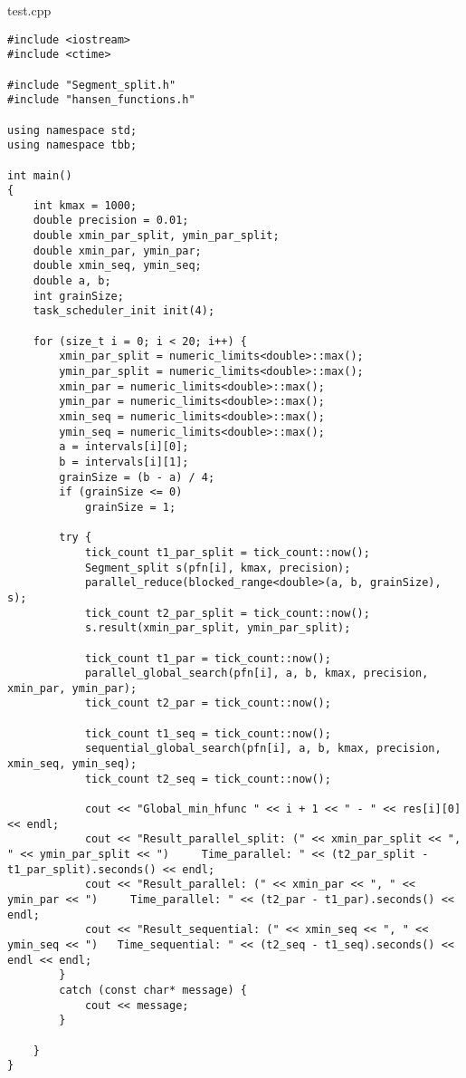 \documentclass{report}
\begin{document}
test.cpp
\begin{lstlisting}
#include <iostream>
#include <ctime>

#include "Segment_split.h"
#include "hansen_functions.h"

using namespace std;
using namespace tbb;

int main()
{
    int kmax = 1000;
    double precision = 0.01;
    double xmin_par_split, ymin_par_split;
    double xmin_par, ymin_par;
    double xmin_seq, ymin_seq;
    double a, b;
    int grainSize;
    task_scheduler_init init(4);

    for (size_t i = 0; i < 20; i++) {
        xmin_par_split = numeric_limits<double>::max();
        ymin_par_split = numeric_limits<double>::max();
        xmin_par = numeric_limits<double>::max();
        ymin_par = numeric_limits<double>::max();
        xmin_seq = numeric_limits<double>::max();
        ymin_seq = numeric_limits<double>::max();
        a = intervals[i][0];
        b = intervals[i][1];
        grainSize = (b - a) / 4;
        if (grainSize <= 0)
            grainSize = 1;

        try {
            tick_count t1_par_split = tick_count::now();
            Segment_split s(pfn[i], kmax, precision);
            parallel_reduce(blocked_range<double>(a, b, grainSize), s);
            tick_count t2_par_split = tick_count::now();
            s.result(xmin_par_split, ymin_par_split);

            tick_count t1_par = tick_count::now();
            parallel_global_search(pfn[i], a, b, kmax, precision, xmin_par, ymin_par);
            tick_count t2_par = tick_count::now();

            tick_count t1_seq = tick_count::now();
            sequential_global_search(pfn[i], a, b, kmax, precision, xmin_seq, ymin_seq);
            tick_count t2_seq = tick_count::now();

            cout << "Global_min_hfunc " << i + 1 << " - " << res[i][0] << endl;
            cout << "Result_parallel_split: (" << xmin_par_split << ", " << ymin_par_split << ")     Time_parallel: " << (t2_par_split - t1_par_split).seconds() << endl;
            cout << "Result_parallel: (" << xmin_par << ", " << ymin_par << ")     Time_parallel: " << (t2_par - t1_par).seconds() << endl;
            cout << "Result_sequential: (" << xmin_seq << ", " << ymin_seq << ")   Time_sequential: " << (t2_seq - t1_seq).seconds() << endl << endl;
        }
        catch (const char* message) {
            cout << message;
        }

    }
}
\end{lstlisting}
\end{document}
